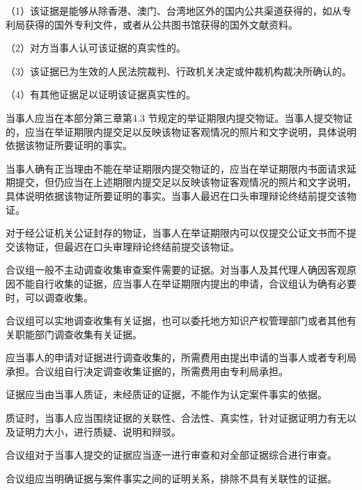 {\setlength{\parindent}{17.1bp}（1）该证据是能够从除香港、澳门、台湾地区外的国内公共渠道获得的，如从专利局获得的国外专利文件，或者从公共图书馆获得的国外文献资料。\par}

{\setlength{\parindent}{17.1bp}（2）对方当事人认可该证据的真实性的。\par}

{\setlength{\parindent}{17.1bp}（3）该证据已为生效的人民法院裁判、行政机关决定或仲裁机构裁决所确认的。\par}

{\setlength{\parindent}{17.1bp}（4）有其他证据足以证明该证据真实性的。\par}

当事人应当在本部分第三章第4.3 节规定的举证期限内提交物证。当事人提交物证的，应当在举证期限内提交足以反映该物证客观情况的照片和文字说明，具体说明依据该物证所要证明的事实。

当事人确有正当理由不能在举证期限内提交物证的，应当在举证期限内书面请求延期提交，但仍应当在上述期限内提交足以反映该物证客观情况的照片和文字说明，具体说明依据该物证所要证明的事实。当事人最迟在口头审理辩论终结前提交该物证。

对于经公证机关公证封存的物证，当事人在举证期限内可以仅提交公证文书而不提交该物证，但最迟在口头审理辩论终结前提交该物证。

合议组一般不主动调查收集审查案件需要的证据。对当事人及其代理人确因客观原因不能自行收集的证据，应当事人在举证期限内提出的申请，合议组认为确有必要时，可以调查收集。

合议组可以实地调查收集有关证据，也可以委托地方知识产权管理部门或者其他有关职能部门调查收集有关证据。

应当事人的申请对证据进行调查收集的，所需费用由提出申请的当事人或者专利局承担。合议组自行决定调查收集证据的，所需费用由专利局承担。

证据应当由当事人质证，未经质证的证据，不能作为认定案件事实的依据。

质证时，当事人应当围绕证据的关联性、合法性、真实性，针对证据证明力有无以及证明力大小，进行质疑、说明和辩驳。

合议组对于当事人提交的证据应当逐一进行审查和对全部证据综合进行审查。

合议组应当明确证据与案件事实之间的证明关系，排除不具有关联性的证据。


